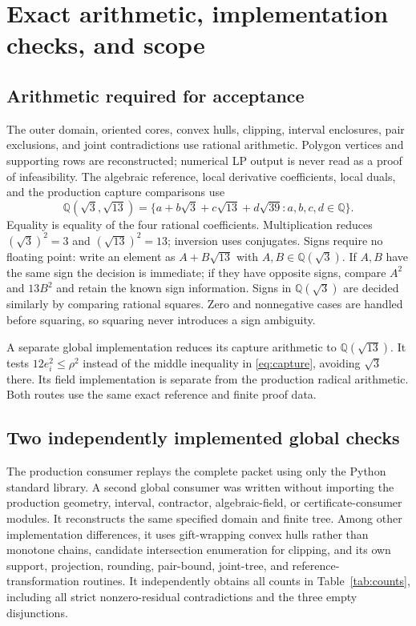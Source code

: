 \documentclass[11pt]{article}
\begin{document}
\section{Exact arithmetic, implementation checks, and scope}\label{sec:trust}

\subsection{Arithmetic required for acceptance}

The outer domain, oriented cores, convex hulls, clipping, interval enclosures, pair exclusions, and joint contradictions use rational arithmetic. Polygon vertices and supporting rows are reconstructed; numerical LP output is never read as a proof of infeasibility. The algebraic reference, local derivative coefficients, local duals, and the production capture comparisons use
\[
 \mathbb Q(\sqrt3,\sqrt{13})
 =\{a+b\sqrt3+c\sqrt{13}+d\sqrt{39}:a,b,c,d\in\mathbb Q\}.
\]
Equality is equality of the four rational coefficients. Multiplication reduces $(\sqrt3)^2=3$ and $(\sqrt{13})^2=13$; inversion uses conjugates. Signs require no floating point: write an element as $A+B\sqrt{13}$ with $A,B\in\mathbb Q(\sqrt3)$. If $A,B$ have the same sign the decision is immediate; if they have opposite signs, compare $A^2$ and $13B^2$ and retain the known sign information. Signs in $\mathbb Q(\sqrt3)$ are decided similarly by comparing rational squares. Zero and nonnegative cases are handled before squaring, so squaring never introduces a sign ambiguity.

A separate global implementation reduces its capture arithmetic to $\mathbb Q(\sqrt{13})$. It tests $12e_i^2\le\rho^2$ instead of the middle inequality in \eqref{eq:capture}, avoiding $\sqrt3$ there. Its field implementation is separate from the production radical arithmetic. Both routes use the same exact reference and finite proof data.

\subsection{Two independently implemented global checks}

The production consumer replays the complete packet using only the Python standard library. A second global consumer was written without importing the production geometry, interval, contractor, algebraic-field, or certificate-consumer modules. It reconstructs the same specified domain and finite tree. Among other implementation differences, it uses gift-wrapping convex hulls rather than monotone chains, candidate intersection enumeration for clipping, and its own support, projection, rounding, pair-bound, joint-tree, and reference-transformation routines. It independently obtains all counts in Table~\ref{tab:counts}, including all strict nonzero-residual contradictions and the three empty disjunctions.
\end{document}
